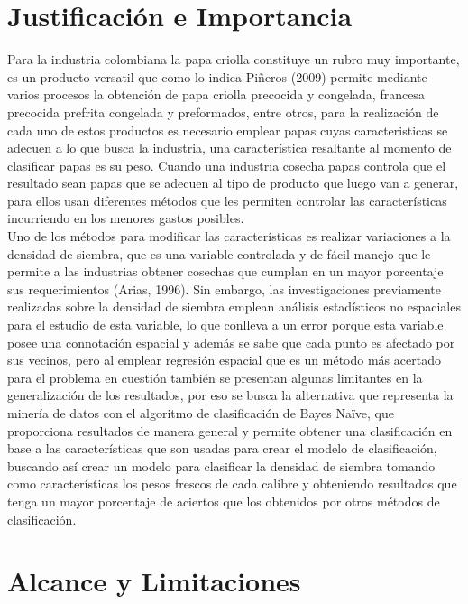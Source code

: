 \section{Justificaci\'on e Importancia}

Para la industria colombiana la papa criolla constituye un rubro muy importante, es un producto versatil que como lo indica Piñeros (2009) permite mediante varios procesos la obtención de papa criolla precocida y congelada, francesa precocida prefrita congelada y preformados, entre otros, para la realización de cada uno de estos productos es necesario emplear papas cuyas caracteristicas se adecuen a lo que busca la industria, una característica resaltante al momento de clasificar papas es su peso. Cuando una industria cosecha papas controla que el resultado sean papas que se adecuen al tipo de producto que luego van a generar, para ellos usan diferentes métodos que les permiten controlar las características incurriendo en los menores gastos posibles.\\

Uno de los métodos para modificar las características es realizar variaciones a la densidad de siembra, que es una variable controlada y de fácil manejo que le permite a las industrias obtener cosechas que cumplan en un mayor porcentaje sus requerimientos (Arias, 1996). Sin embargo, las investigaciones previamente realizadas sobre la densidad de siembra emplean análisis estadísticos no espaciales para el estudio de esta variable, lo que conlleva a un error porque esta variable posee una connotación espacial y además se sabe que cada punto es afectado por sus vecinos, pero al emplear regresión espacial que es un método más acertado para el problema en cuestión también se presentan algunas limitantes en la generalización de los resultados, por eso se busca la alternativa que representa la minería de datos con el algoritmo de clasificación de Bayes Naïve, que proporciona resultados de manera general y permite obtener una clasificación en base a las características que son usadas para crear el modelo de clasificación, buscando así crear un modelo para clasificar la densidad de siembra tomando como características los pesos frescos de cada calibre y obteniendo resultados que tenga un mayor porcentaje de aciertos que los obtenidos por otros métodos de clasificación.
	
\section{Alcance y Limitaciones}

